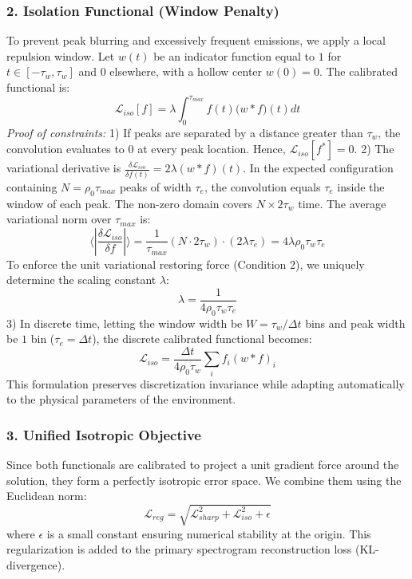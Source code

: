 \documentclass[11pt,a4paper]{article}
\begin{document}
\subsubsection*{2. Isolation Functional (Window Penalty)}
To prevent peak blurring and excessively frequent emissions, we apply a local repulsion window. Let $w(t)$ be an indicator function equal to $1$ for $t \in [-\tau_w, \tau_w]$ and $0$ elsewhere, with a hollow center $w(0)=0$. The calibrated functional is:
\begin{equation}
\mathcal{L}_{iso}[f] = \lambda \int_{0}^{\tau_{max}} f(t) \big(w * f\big)(t) dt
\end{equation}
\textit{Proof of constraints:}
1) If peaks are separated by a distance greater than $\tau_w$, the convolution evaluates to $0$ at every peak location. Hence, $\mathcal{L}_{iso}[f^*] = 0$.
2) The variational derivative is $\frac{\delta \mathcal{L}_{iso}}{\delta f(t)} = 2\lambda (w * f)(t)$. In the expected configuration containing $N = \rho_0 \tau_{max}$ peaks of width $\tau_e$, the convolution equals $\tau_e$ inside the window of each peak. The non-zero domain covers $N \times 2\tau_w$ time. The average variational norm over $\tau_{max}$ is:
\begin{equation}
\langle | \frac{\delta \mathcal{L}_{iso}}{\delta f} | \rangle = \frac{1}{\tau_{max}} \left( N \cdot 2\tau_w \right) \cdot (2\lambda \tau_e) = 4 \lambda \rho_0 \tau_w \tau_e
\end{equation}
To enforce the unit variational restoring force (Condition 2), we uniquely determine the scaling constant $\lambda$:
\begin{equation}
\lambda = \frac{1}{4 \rho_0 \tau_w \tau_e}
\end{equation}
3) In discrete time, letting the window width be $W = \tau_w / \Delta t$ bins and peak width be $1$ bin ($\tau_e = \Delta t$), the discrete calibrated functional becomes:
\begin{equation}
\mathcal{L}_{iso} = \frac{\Delta t}{4 \rho_0 \tau_w} \sum_{i} f_i (w * f)_i
\end{equation}
This formulation preserves discretization invariance while adapting automatically to the physical parameters of the environment.

\subsubsection*{3. Unified Isotropic Objective}
Since both functionals are calibrated to project a unit gradient force around the solution, they form a perfectly isotropic error space. We combine them using the Euclidean norm:
\begin{equation}
\mathcal{L}_{reg} = \sqrt{\mathcal{L}_{sharp}^2 + \mathcal{L}_{iso}^2 + \epsilon}
\end{equation}
where $\epsilon$ is a small constant ensuring numerical stability at the origin. This regularization is added to the primary spectrogram reconstruction loss (KL-divergence).
\end{document}
